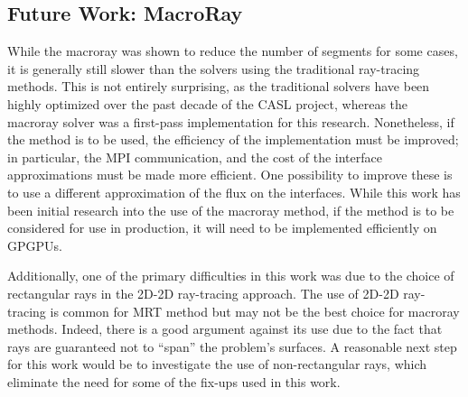 {{    \subsection{Future Work: MacroRay}{\label{ssec:Future Work:MacroRay}
      While the macroray was shown to reduce the number of segments for some cases, it is generally still slower than the solvers using the traditional ray-tracing methods.
      This is not entirely surprising, as the traditional solvers have been highly optimized over the past decade of the \ac{CASL} project, whereas the macroray solver was a first-pass implementation for this research.
      Nonetheless, if the method is to be used, the efficiency of the implementation must be improved; in particular, the MPI communication, and the cost of the interface approximations must be made more efficient.
      One possibility to improve these is to use a different approximation of the flux on the interfaces.
      While this work has been initial research into the use of the macroray method, if the method is to be considered for use in production, it will need to be implemented efficiently on \acp{GPGPU}.

      Additionally, one of the primary difficulties in this work was due to the choice of rectangular rays in the 2D-2D ray-tracing approach.
      The use of 2D-2D ray-tracing is common for \ac{MRT} method but may not be the best choice for macroray methods.
      Indeed, there is a good argument against its use due to the fact that rays are guaranteed not to ``span'' the problem's surfaces.
      A reasonable next step for this work would be to investigate the use of non-rectangular rays, which eliminate the need for some of the fix-ups used in this work.
    }
  }

  \printbibliography
}